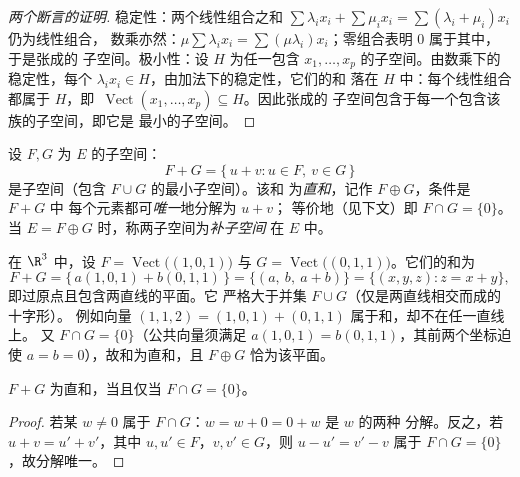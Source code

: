 \begin{proof}[两个断言的证明]
稳定性：两个线性组合之和 $\sum\lambda_i x_i +
\sum\mu_i x_i = \sum(\lambda_i + \mu_i)x_i$ 仍为线性组合，
数乘亦然：$\mu\sum\lambda_i x_i = \sum(\mu\lambda_i)
x_i$；零组合表明 $0$ 属于其中，于是张成的
子空间。极小性：设 $H$ 为任一包含 $x_1,
\dots, x_p$ 的子空间。由数乘下的稳定性，每个
$\lambda_i x_i \in H$，由加法下的稳定性，它们的和
落在 $H$ 中：每个线性组合都属于 $H$，即\
$\operatorname{Vect}(x_1, \dots, x_p) \subseteq H$。因此张成的
子空间包含于每一个包含该族的子空间，即它是
最小的子空间。
\end{proof}

\begin{definition}[和、直和]\label{def:b1:vspaces:sum}
设 $F, G$ 为 $E$ 的子空间：
\[
F + G = \{\,u + v : u \in F,\ v \in G\,\}
\]
是子空间（包含 $F \cup G$ 的最小子空间）。该和
为\emph{直和}，记作 $F \oplus G$，条件是 $F + G$ 中
每个元素都可\emph{唯一}地分解为 $u + v$；
等价地（见下文）即 $F \cap G = \{0\}$。当 $E = F \oplus
G$ 时，称两子空间为\emph{补子空间}
在 $E$ 中。
\end{definition}

\begin{example}[两直线之和]
\label{ex:b1:vspaces:sumoflines}
在 $\R^3$ 中，设 $F = \operatorname{Vect}\bigl((1,0,1)\bigr)$ 与
$G = \operatorname{Vect}\bigl((0,1,1)\bigr)$。它们的和为
\[
F + G = \{\,a(1,0,1) + b(0,1,1)\,\}
= \{(a,\ b,\ a + b)\} = \{(x, y, z) : z = x + y\},
\]
即过原点且包含两直线的平面。它
严格大于并集 $F \cup G$（仅是两直线相交而成的十字形）。
例如向量 $(1, 1, 2) = (1,0,1) + (0,1,1)$ 属于和，却不在任一直线上。
又 $F \cap G = \{0\}$（公共向量须满足
$a(1,0,1) = b(0,1,1)$，其前两个坐标迫使
$a = b = 0$），故和为直和，且 $F \oplus
G$ 恰为该平面。
\end{example}

\begin{proposition}\label{prop:b1:vspaces:directsum}
$F + G$ 为直和，当且仅当 $F \cap G = \{0\}$。
\end{proposition}

\begin{proof}
若某 $w \neq 0$ 属于 $F \cap G$：$w = w + 0 = 0 + w$ 是 $w$ 的两种
分解。反之，若 $u + v = u' + v'$，其中 $u, u'
\in F$，$v, v' \in G$，则 $u - u' = v' - v$ 属于 $F \cap G =
\{0\}$，故分解唯一。
\end{proof}

